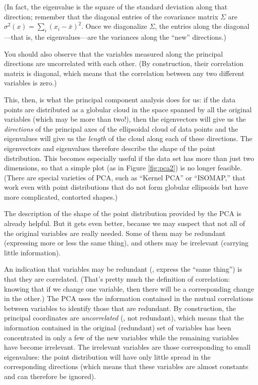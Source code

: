 (In fact, the eigenvalue is the square of the standard deviation along
that direction; remember that the diagonal entries of the covariance
matrix $\Sigma$ are $\sigma^2(x) = \sum_i (x_i - \bar{x})^2$.  Once we
diagonalize $\Sigma$, the entries along the diagonal---that is, the
eigenvalues---are the variances along the ``new'' directions.)

You should also observe that the variables measured along the
principal directions are uncorrelated with each other. (By
construction, their correlation matrix is diagonal, which means that
the correlation between any two different variables is zero.)

This, then, is what the principal component analysis does for us: if
the data points are distributed as a globular cloud in the space
spanned by all the original variables (which may be more than two!),
then the eigenvectors will give us the \emph{directions} of the
principal axes of the ellipsoidal cloud of data points and the
eigenvalues will give us the \emph{length} of the cloud along each of
these directions. The eigenvectors and eigenvalues therefore describe
the shape of the point distribution. This becomes especially useful if
the data set has more than just two dimensions, so that a simple plot
(as in Figure \ref{fig:pca2}) is no longer feasible.  (There are
special varieties of PCA, such as ``Kernel PCA'' or ``ISOMAP,'' that
work even with point distributions that do not form globular
ellipsoids but have more complicated, contorted shapes.)

The description of the shape of the point distribution provided by the
PCA is already helpful. But it gets even\vadjust{\pagebreak} better, because we may
suspect that not all of the original variables are really needed. Some
of them may be redundant (expressing more or less the same thing), and
others may be irrelevant (carrying little information).

An indication that variables may be redundant (\ie, express the ``same
thing'') is that they are correlated. (That's pretty much the
definition of correlation: knowing that if we change one variable,
then there will be a corresponding change in the other.)  The PCA uses
the information contained in the mutual correlations between variables
to identify those that are redundant. By construction, the principal
coordinates are \emph{uncorrelated} (\ie, not redundant), which means
that the information contained in the original (redundant) set of
variables has been concentrated in only a few of the new variables
while the remaining variables have become irrelevant.  The irrelevant
variables are those corresponding to small eigenvalues: the point
distribution will have only little spread in the corresponding
directions (which means that these variables are almost constants and
can therefore be ignored).

